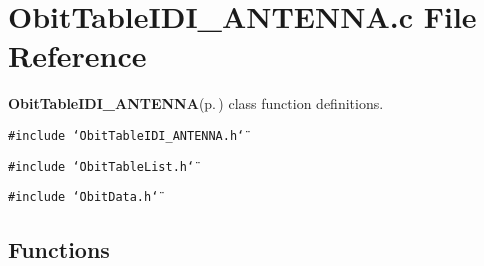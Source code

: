 \section{Obit\-Table\-IDI\_\-ANTENNA.c File Reference}
\label{ObitTableIDI__ANTENNA_8c}
{\bf Obit\-Table\-IDI\_\-ANTENNA}{\rm (p.\,\pageref{structObitTableIDI__ANTENNA})} class function definitions. 

{\tt \#include \char`\"{}Obit\-Table\-IDI\_\-ANTENNA.h\char`\"{}}\par
{\tt \#include \char`\"{}Obit\-Table\-List.h\char`\"{}}\par
{\tt \#include \char`\"{}Obit\-Data.h\char`\"{}}\par
\subsection*{Functions}
